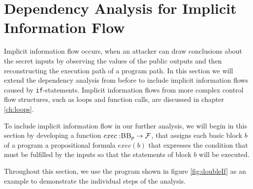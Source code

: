 \section{Dependency Analysis for Implicit Information Flow}
Implicit information flow occurs, when an attacker can draw conclusions about the secret inputs by observing the values of the public outputs and then reconstructing the execution path of a program path. In this section we will extend the dependency analysis from before to include implicit information flows caused by \texttt{if}-statements. Implicit information flows from more complex control flow structures, such as loops and function calls, are discussed in chapter \ref{ch:loops}. 

To include implicit information flow in our further analysis, we will begin in this section by developing a function $exec: \mbb_p \to \mbform$, that assigns each basic block $b$ of a program a propositional formula $exec(b)$ that expresses the condition that must be fulfilled by the inputs so that the statements of block $b$ will be executed. 

Throughout this section, we use the program shown in figure \ref{fig:doubleIf} as an example to demonstrate the individual steps of the analysis.

